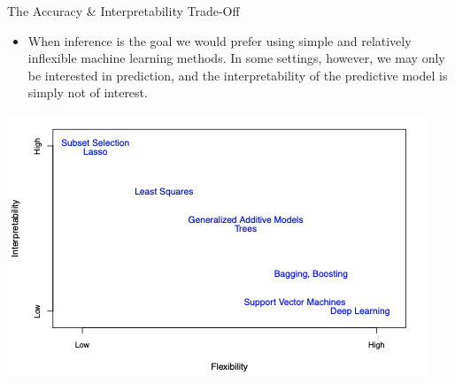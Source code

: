\documentclass[aspectratio=169,xcolor=dvipsnames]{beamer}
\begin{document}
\begin{frame}{The Accuracy \& Interpretability Trade-Off}
\begin{itemize}
\setlength{\itemsep}{.25cm}

\item When inference is the goal we would prefer using simple and relatively inflexible machine learning methods. In some settings, however, we may only be interested in prediction, and the interpretability of the predictive model is simply not of interest.



\end{itemize}
\begin{center}
\includegraphics[scale=0.5]{images/trade_off.png}
\end{center}
\end{frame}

\end{document}

